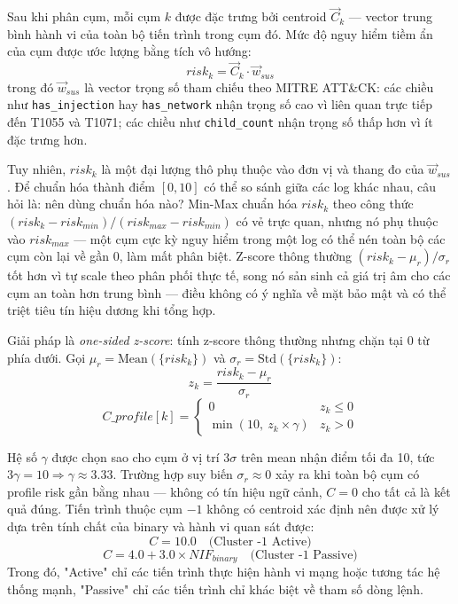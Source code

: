 \documentclass[../main.tex]{subfiles}
\begin{document}
Sau khi phân cụm, mỗi cụm $k$ được đặc trưng bởi centroid $\vec{C}_k$ — vector trung bình hành vi của toàn bộ tiến trình trong cụm đó. Mức độ nguy hiểm tiềm ẩn của cụm được ước lượng bằng tích vô hướng:
\begin{equation}
    risk_k = \vec{C}_k \cdot \vec{w}_{sus} \tag{1.13}
\end{equation}
trong đó $\vec{w}_{sus}$ là vector trọng số tham chiếu theo MITRE ATT\&CK: các chiều như \texttt{has\_injection} hay \texttt{has\_network} nhận trọng số cao vì liên quan trực tiếp đến T1055 và T1071; các chiều như \texttt{child\_count} nhận trọng số thấp hơn vì ít đặc trưng hơn.

Tuy nhiên, $risk_k$ là một đại lượng thô phụ thuộc vào đơn vị và thang đo của $\vec{w}_{sus}$. Để chuẩn hóa thành điểm $[0, 10]$ có thể so sánh giữa các log khác nhau, câu hỏi là: nên dùng chuẩn hóa nào? Min-Max chuẩn hóa $risk_k$ theo công thức $(risk_k - risk_{min})/(risk_{max} - risk_{min})$ có vẻ trực quan, nhưng nó phụ thuộc vào $risk_{max}$ — một cụm cực kỳ nguy hiểm trong một log có thể nén toàn bộ các cụm còn lại về gần 0, làm mất phân biệt. Z-score thông thường $(risk_k - \mu_r)/\sigma_r$ tốt hơn vì tự scale theo phân phối thực tế, song nó sản sinh cả giá trị âm cho các cụm an toàn hơn trung bình — điều không có ý nghĩa về mặt bảo mật và có thể triệt tiêu tín hiệu dương khi tổng hợp.

Giải pháp là \textit{one-sided z-score}: tính z-score thông thường nhưng chặn tại 0 từ phía dưới. Gọi $\mu_r = \text{Mean}(\{risk_k\})$ và $\sigma_r = \text{Std}(\{risk_k\})$:
\begin{equation}
    z_k = \frac{risk_k - \mu_r}{\sigma_r} \tag{1.14}
\end{equation}
\begin{equation}
    C\_profile[k] = \begin{cases} 0 & z_k \le 0 \\ \min\!\left(10,\ z_k \times \gamma\right) & z_k > 0 \end{cases} \tag{1.15}
\end{equation}

Hệ số $\gamma$ được chọn sao cho cụm ở vị trí $3\sigma$ trên mean nhận điểm tối đa 10, tức $3\gamma = 10 \Rightarrow \gamma \approx 3.33$. Trường hợp suy biến $\sigma_r \approx 0$ xảy ra khi toàn bộ cụm có profile risk gần bằng nhau — không có tín hiệu ngữ cảnh, $C = 0$ cho tất cả là kết quả đúng. Tiến trình thuộc cụm $-1$ không có centroid xác định nên được xử lý dựa trên tính chất của binary và hành vi quan sát được:
\begin{equation}
    C = 10.0 \quad \text{(Cluster -1 Active)} \tag{1.16}
\end{equation}
\begin{equation}
    C = 4.0 + 3.0 \times NIF_{binary} \quad \text{(Cluster -1 Passive)} \tag{1.17}
\end{equation}
Trong đó, "Active" chỉ các tiến trình thực hiện hành vi mạng hoặc tương tác hệ thống mạnh, "Passive" chỉ các tiến trình chỉ khác biệt về tham số dòng lệnh.
\end{document}
